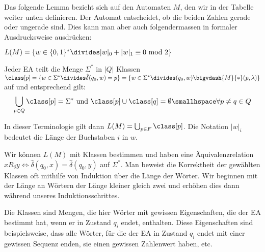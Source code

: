 Das folgende Lemma bezieht sich auf den Automaten $M$, den wir in der Tabelle weiter unten definieren.
Der Automat entscheidet, ob die beiden Zahlen gerade oder ungerade sind.
Dies kann man aber auch folgendermassen in formaler Ausdrucksweise ausdrücken:

\inlinelemma $L(M) = \{ w \in \{ 0, 1 \}^* \divides |w|_0 + |w|_1 \equiv 0 \text{ mod } 2 \}$

Jeder EA teilt die Menge $\Sigma^*$ in $|Q|$ Klassen
$\class[p] = \{ w \in \Sigma^* \divides \hdelta(q_0, w) = p \} = \{ w \in \Sigma^* \divides (q_0, w) \bigvdash{M}{*} (p, \lambda) \}$ auf
und entsprechend gilt:
\begin{align*}
    \bigcup_{p \in Q} \class[p] = \Sigma^* \text{ und } \class[p] \cup \class[q] = \emptyset \smallhspace \forall p \neq q \in Q
\end{align*}

In dieser Terminologie gilt dann $L(M) = \bigcup_{p \in F} \class[p]$.
Die Notation $|w|_i$ bedeutet die Länge der Buchstaben $i$ in $w$.

Wir können $L(M)$ mit Klassen bestimmen und haben eine Äquivalenzrelation $x R_\delta y \Leftrightarrow \hat{\delta}(q_0, x) = \hat{\delta}(q_0, y)$ auf $\Sigma^*$.
Man beweist die Korrektheit der gewählten Klassen oft mithilfe von Induktion über die Länge der Wörter.
Wir beginnen mit der Länge an Wörtern der Länge kleiner gleich zwei und erhöhen dies dann während unseres Induktionsschrittes.

\inlineintuition Die Klassen sind Mengen, die hier Wörter mit gewissen Eigenschaften, die der EA bestimmt hat, wenn er in Zustand $q_i$ endet, enthalten.
Diese Eigenschaften sind beispielsweise, dass alle Wörter, für die der EA in Zustand $q_i$ endet mit einer gewissen Sequenz enden, sie einen gewissen Zahlenwert haben, etc.

